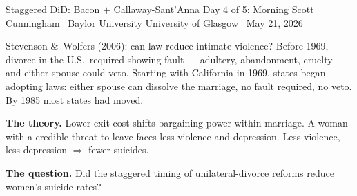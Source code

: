 \documentclass[aspectratio=169,11pt]{beamer}
\begin{document}

\remixtitleframe
  {Staggered DiD: Bacon $+$ Callaway-Sant'Anna}
  {Day 4 of 5: Morning}
  {Scott Cunningham \textperiodcentered\ Baylor University}
  {University of Glasgow \textperiodcentered\ May 21, 2026}

\begin{frame}{Stevenson \&\ Wolfers (2006): can law reduce intimate violence?}
\vspace{0.4em}
Before 1969, divorce in the U.S.\ required showing fault --- adultery, abandonment, cruelty --- and either spouse could veto. \;Starting with California in 1969, states began adopting  laws: either spouse can dissolve the marriage, no fault required, no veto. \;By 1985 most states had moved.

\vspace{0.6em}
\textbf{The theory.} \;Lower exit cost shifts bargaining power within marriage. \;A woman with a credible threat to leave faces less violence and depression. \;Less violence, less depression $\Rightarrow$ fewer suicides.

\vspace{0.6em}
\textbf{The question.} \;Did the staggered timing of unilateral-divorce reforms reduce women's suicide rates?

\vspace{0.4em}
\end{frame}
\end{document}
